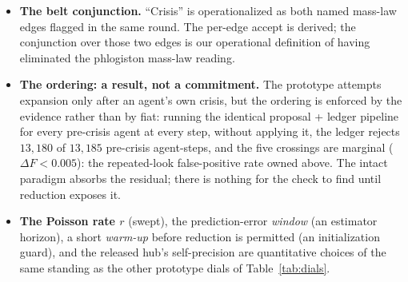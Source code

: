 \begin{itemize}
\item \textbf{The belt conjunction.} ``Crisis'' is operationalized as both named
mass-law edges flagged in the same round. The per-edge accept is derived; the conjunction over
those two edges is our operational definition of having eliminated the phlogiston mass-law
reading.
\item \textbf{The ordering: a result, not a commitment.} The prototype attempts expansion
only after an agent's own crisis, but the ordering is enforced by the evidence rather than by
fiat: running the identical proposal + ledger pipeline for every pre-crisis agent at every
step, without applying it, the ledger rejects $13{,}180$ of $13{,}185$ pre-crisis
agent-steps, and the five crossings are marginal ($\Delta F < 0.005$): the repeated-look
false-positive rate owned above. The intact paradigm absorbs the residual; there is nothing
for the check to find until reduction exposes it.
\item \textbf{The Poisson rate $r$} (swept), the prediction-error \emph{window} (an estimator
horizon), a short \emph{warm-up} before reduction is permitted (an initialization guard), and
the released hub's self-precision are quantitative choices of the same standing as the other
prototype dials of Table~\ref{tab:dials}.
\end{itemize}

